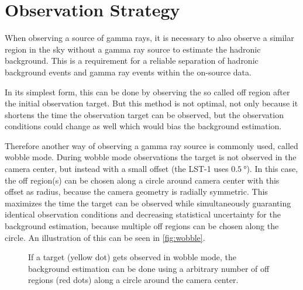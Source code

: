 \section{Observation Strategy}
\label{sec:wobble}
When observing a source of gamma rays, it is necessary to also observe a similar region in the sky without a gamma ray source to estimate the hadronic background.
This is a requirement for a reliable separation of hadronic background events and gamma ray events within the on-source data.

In its simplest form, this can be done by observing the so called off region after the initial observation target.
But this method is not optimal, not only because it shortens the time the observation target can be observed, but the observation conditions could
change as well which would bias the background estimation.

Therefore another way of observing a gamma ray source is commonly used, called wobble mode.
During wobble mode observations the target is not observed in the camera center, but instead with a small offset (the LST-1 uses $\SI{0.5}{\degree}$).
In this case, the off region(s) can be chosen along a circle around camera center with this offset as radius, because the camera geometry is radially symmetric.
This maximizes the time the target can be observed while simultaneously guaranting identical observation conditions and decreasing statistical uncertainty 
for the background estimation, because multiple off regions can be chosen along the circle.
An illustration of this can be seen in \autoref{fig:wobble}.

\begin{figure}
    \centering
    \caption{If a target (yellow dot) gets observed in wobble mode, the background estimation can be done using a arbitrary number of off regions 
        (red dots) along a circle around the camera center.
    }
    \label{fig:wobble}
\end{figure}

